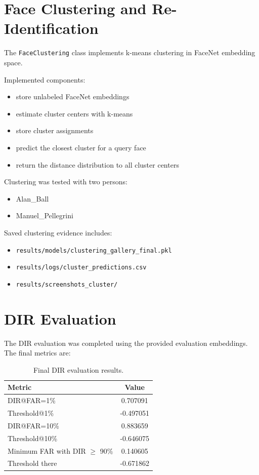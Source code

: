 \documentclass[11pt,a4paper]{article}
\begin{document}
\section{Face Clustering and Re-Identification}

The \texttt{FaceClustering} class implements k-means clustering in FaceNet embedding space.

Implemented components:

\begin{itemize}[noitemsep]
    \item store unlabeled FaceNet embeddings
    \item estimate cluster centers with k-means
    \item store cluster assignments
    \item predict the closest cluster for a query face
    \item return the distance distribution to all cluster centers
\end{itemize}

Clustering was tested with two persons:

\begin{itemize}[noitemsep]
    \item Alan\_Ball
    \item Manuel\_Pellegrini
\end{itemize}

Saved clustering evidence includes:

\begin{itemize}[noitemsep]
    \item \texttt{results/models/clustering\_gallery\_final.pkl}
    \item \texttt{results/logs/cluster\_predictions.csv}
    \item \texttt{results/screenshots\_cluster/}
\end{itemize}

\section{DIR Evaluation}

The DIR evaluation was completed using the provided evaluation embeddings. The final metrics are:

\begin{table}[h]
\centering
\begin{tabular}{lc}
\toprule
\textbf{Metric} & \textbf{Value} \\
\midrule
DIR@FAR=1\% & 0.707091 \\
Threshold@1\% & -0.497051 \\
DIR@FAR=10\% & 0.883659 \\
Threshold@10\% & -0.646075 \\
Minimum FAR with DIR $\geq$ 90\% & 0.140605 \\
Threshold there & -0.671862 \\
\bottomrule
\end{tabular}
\caption{Final DIR evaluation results.}
\end{table}
\end{document}
